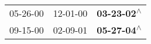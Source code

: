 \begin{supertabular}{lll}
 05-26-00\textsuperscript{} &  12-01-00\textsuperscript{} &  \textbf{03-23-02\textsuperscript{$\wedge$}} \\
 09-15-00\textsuperscript{} &  02-09-01\textsuperscript{} &  \textbf{05-27-04\textsuperscript{$\wedge$}} \\
\end{supertabular}
